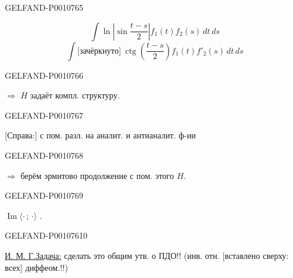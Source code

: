 \begin{GelfandAdjacentEvidence}{GELFAND-P001076}{5}


\begin{equation*}
\int\ln\left|\sin\frac{t-s}{2}\right|f_1(t)f_2(s)\,dt\,ds
\end{equation*}
\begin{equation*}
\int\text{[зачёркнуто]}\ \operatorname{ctg}\left(\frac{t-s}{2}\right)f_1(t)f'_2(s)\,dt\,ds
\end{equation*}
\end{GelfandAdjacentEvidence}
\begin{GelfandAdjacentEvidence}{GELFAND-P001076}{6}


$\Rightarrow$ $H$ задаёт компл. структуру.
\end{GelfandAdjacentEvidence}
\begin{GelfandAdjacentEvidence}{GELFAND-P001076}{7}


[Справа:] с пом. разл. на аналит. и антианалит. ф-ии
\end{GelfandAdjacentEvidence}
\begin{GelfandAdjacentEvidence}{GELFAND-P001076}{8}

$\Rightarrow$ берём эрмитово продолжение с пом. этого $H$.
\end{GelfandAdjacentEvidence}
\begin{GelfandAdjacentEvidence}{GELFAND-P001076}{9}


$\operatorname{Im}\langle\cdot\,;\,\cdot\rangle$
.
\end{GelfandAdjacentEvidence}
\begin{GelfandAdjacentEvidence}{GELFAND-P001076}{10}


\uline{И. М. Г.}\quad\uline{Задача:} сделать это общим утв. о ПДО!!
(инв. отн. [вставлено сверху: всех] диффеом.!!)
\end{GelfandAdjacentEvidence}



